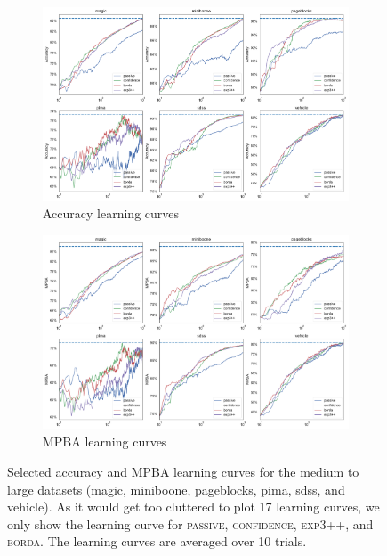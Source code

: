 \documentclass[fleqn,10pt,lineno]{wlpeerj} %
\begin{document}
\begin{figure}[tbp]
	\centering
	\begin{subfigure}[t]{\textwidth}
        \centering
        \includegraphics[width=\textwidth]{figures/learning_curves-accuracy-large}
		\caption{Accuracy learning curves}
		\label{fig:learning_curves-mpba-small}
	\end{subfigure}
	\begin{subfigure}[t]{\textwidth}
        \centering
        \includegraphics[width=\textwidth]{figures/learning_curves-mpba-large}
		\caption{MPBA learning curves}
		\label{fig:learning_curves-mpba-large}
    \end{subfigure}
	\caption[Selected learning curves]{Selected accuracy and MPBA learning
	curves for the medium to large datasets (magic, miniboone, pageblocks,
	pima, sdss, and vehicle). As it would get too cluttered to plot 17 learning
	curves, we only show the learning curve for \textsc{passive},
	\textsc{confidence}, \textsc{exp3++}, and \textsc{borda}. The learning
	curves are averaged over 10 trials.}
	\label{fig:learning_curves-large}
\end{figure}
\end{document}
